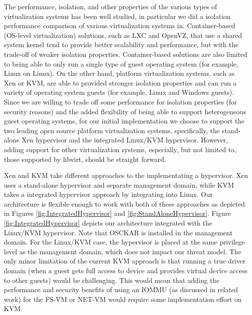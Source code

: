 The performance, isolation, and other properties of the various types of virtualization systems has been well studied, in particular we did a isolation performance comparison of various virtualization systems in\cite{isolation_paper_2007}. Container-based (OS-level virtualization) solutions, such as LXC and OpenVZ, that use a shared system kernel tend to provide better scalability and performance, but with the trade-off of weaker isolation properties. Container-based solutions are also limited to being able to only run a single type of guest operating system (for example, Linux on Linux).  On the other hand, platform virtualization systems, such as Xen or KVM, are able to provided stronger isolation properties and can run a variety of operating system guests (for example, Linux and Windows guests). Since we are willing to trade off some performance for isolation properties (for security reasons) and the added flexibility of being able to support heterogeneous guest operating systems, for our initial implementation we choose to support the two leading open source platform virtualization systems, specifically, the stand-alone Xen hypervisor and the integrated Linux/KVM hypervisor. However, adding support for other virtualization systems, especially, but not limited to, those supported by libvirt, should be straight forward.

Xen and KVM take different approaches to the implementating a hypervisor. Xen uses a stand-alone hypervisor and separate management domain, while KVM takes a integrated hypervisor approach by integrating into Linux. Our architecture is flexible enough to work with both of these approaches as depicted in Figures \ref{fig:IntegratedHypervisor} and \ref{fig:StandAloneHypervisor}. Figure \ref{fig:IntegratedHypervisor} depicts our architecture integrated with the Linux/KVM hypervisor. Note that OSCKAR is installed in the management domain. For the Linux/KVM case, the hypervisor is placed at the same privilege level as the management domain, which does not impact our threat model. The only minor limitation of the current KVM approach is that running a true driver domain (when a guest gets full access to device and provides virtual device access to other guests) would be challenging\cite{kvm_driver_domain_2009}. This would mean that adding the performance and security benefits of using an IOMMU (as discussed in related work) for the FS-VM or NET-VM would require some implementation effort on KVM.

